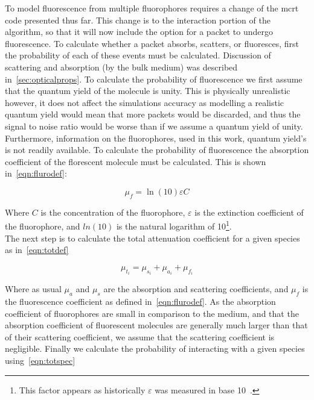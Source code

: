To model fluorescence from multiple fluorophores requires a change of the \gls*{mcrt} code presented thus far.
This change is to the interaction portion of the algorithm, so that it will now include the option for a packet to undergo fluorescence.
To calculate whether a packet absorbs, scatters, or fluoresces, first the probability of each of these events must be calculated.
Discussion of scattering and absorption (by the bulk medium) was described in~\cref{sec:opticalprops}.
To calculate the probability of fluorescence we first assume that the quantum yield of the molecule is unity.
This is physically unrealistic however, it does not affect the simulations accuracy as modelling a realistic quantum yield would mean that more packets would be discarded, and thus the signal to noise ratio would be worse than if we assume a quantum yield of unity.
Furthermore, information on the fluorophores, used in this work, quantum yield's is not readily available.
To calculate the probability of fluorescence the absorption coefficient of the florescent molecule must be calculated.
This is shown in~\cref{eqn:flurodef}:

\begin{equation}
\mu_f=\ln\left(10\right)\varepsilon C
\label{eqn:flurodef}
\end{equation}

Where $C$ is the concentration of the fluorophore, $\varepsilon$ is the extinction coefficient of the fluorophore, and $ln(10)$ is the natural logarithm of 10\footnote{This factor appears as historically $\varepsilon$ was measured in base 10~\cite{jacques2013optical}.}.\\

The next step is to calculate the total attenuation coefficient for a given species as in~\cref{eqn:totdef}

\begin{equation}
\mu_{t_i}=\mu_{s_i}+\mu_{a_i}+\mu_{f_i}
\label{eqn:totdef}
\end{equation}

Where as usual $\mu_a$ and $\mu_s$ are the absorption and scattering coefficients, and $\mu_f$ is the fluorescence coefficient as defined in~\cref{eqn:flurodef}.
As the absorption coefficient of fluorophores are small in comparison to the medium, and that the absorption coefficient of fluorescent molecules are generally much larger than that of their scattering coefficient, we assume that the scattering coefficient is negligible.
Finally we calculate the probability of interacting with a given species using~\cref{eqn:totspec}

